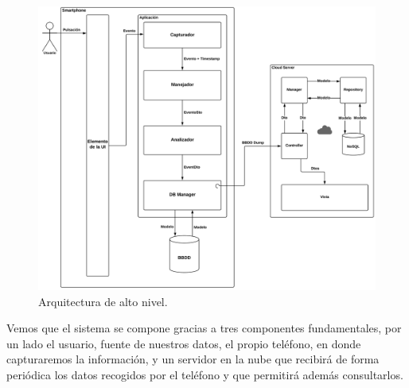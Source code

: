 \documentclass[12pt,a4paper,oneside]{book} %
\begin{document}
 \begin{landscape}
\begin{figure}[ht]
  \begin{center} \setlength{\unitlength}{0.0105in}
     \includegraphics[width=1.2\textwidth]{pictures/architecture/highLevelArch01.png}
  \end{center}
  \caption[Arquitectura de alto nivel]{Arquitectura de alto nivel.}
    \label{fig:LandscapeFigure}
\end{figure}
\end{landscape}

\newpage
Vemos que el sistema se compone gracias a tres componentes fundamentales, por un lado el usuario, fuente de nuestros datos, el propio teléfono, en donde capturaremos la información, y un servidor en la nube que recibirá de forma periódica los datos recogidos por el teléfono y que permitirá además consultarlos. 
\newline
\newline
\end{document}
